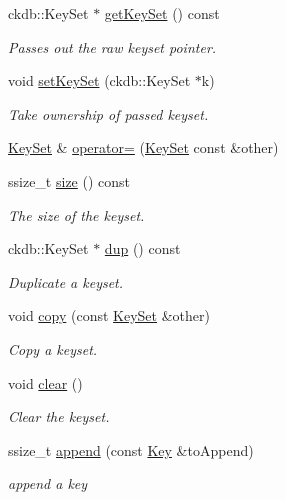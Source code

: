 \begin{DoxyCompactItemize}
\item 
ckdb\-::\-Key\-Set $\ast$ \hyperlink{classkdb_1_1KeySet_aa79bbbfb6e2f3e9c48cb3e595f9cda51}{get\-Key\-Set} () const 
\begin{DoxyCompactList}\small\item\em Passes out the raw keyset pointer. \end{DoxyCompactList}\item 
void \hyperlink{classkdb_1_1KeySet_a9f3ec4eebe304185527b08a6fa01b77c}{set\-Key\-Set} (ckdb\-::\-Key\-Set $\ast$k)
\begin{DoxyCompactList}\small\item\em Take ownership of passed keyset. \end{DoxyCompactList}\item 
\hyperlink{classkdb_1_1KeySet}{Key\-Set} \& \hyperlink{classkdb_1_1KeySet_a1c54736b7206bc2253d02a5bf4b3ccfb}{operator=} (\hyperlink{classkdb_1_1KeySet}{Key\-Set} const \&other)
\item 
ssize\-\_\-t \hyperlink{classkdb_1_1KeySet_a18b332fe23a7f793f80f9b22b5727584}{size} () const 
\begin{DoxyCompactList}\small\item\em The size of the keyset. \end{DoxyCompactList}\item 
ckdb\-::\-Key\-Set $\ast$ \hyperlink{classkdb_1_1KeySet_a72d0b50194fb1900c468b53e749369a2}{dup} () const 
\begin{DoxyCompactList}\small\item\em Duplicate a keyset. \end{DoxyCompactList}\item 
void \hyperlink{classkdb_1_1KeySet_a28fd33fdaecf1d57d4dddac7058f5d38}{copy} (const \hyperlink{classkdb_1_1KeySet}{Key\-Set} \&other)
\begin{DoxyCompactList}\small\item\em Copy a keyset. \end{DoxyCompactList}\item 
void \hyperlink{classkdb_1_1KeySet_a38f5159e39758aa632421d2fe7440633}{clear} ()
\begin{DoxyCompactList}\small\item\em Clear the keyset. \end{DoxyCompactList}\item 
ssize\-\_\-t \hyperlink{classkdb_1_1KeySet_a0d4b2f3aa9f58d10053561135b50233e}{append} (const \hyperlink{classkdb_1_1Key}{Key} \&to\-Append)
\begin{DoxyCompactList}\small\item\em append a key \end{DoxyCompactList}\item 

\end{DoxyCompactItemize}
